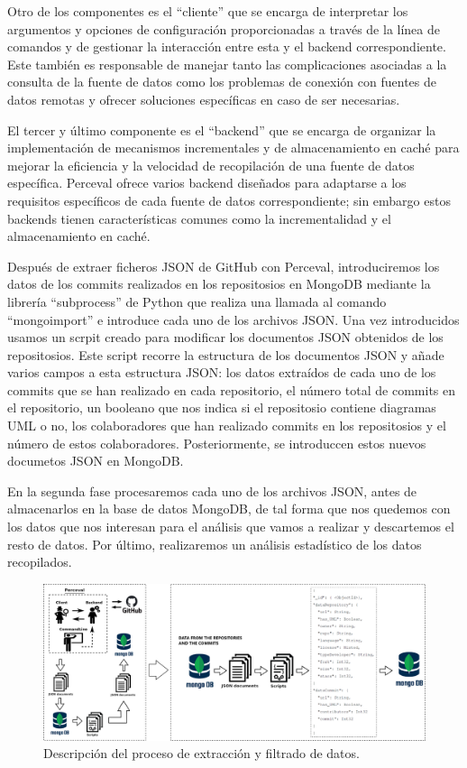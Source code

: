 \documentclass[a4paper, 12pt]{book}
\begin{document}
Otro de los componentes es el ``cliente'' que se encarga de interpretar los argumentos y opciones de configuración proporcionadas a través de la línea de comandos y de gestionar la interacción entre esta y el backend correspondiente.
Este también es responsable de manejar tanto las complicaciones asociadas a la consulta de la fuente de datos como los problemas de conexión con fuentes de datos remotas y ofrecer soluciones específicas en caso de ser necesarias.
 

El tercer y último componente es el ``backend'' que se encarga de organizar la implementación de mecanismos incrementales y de almacenamiento en caché para mejorar la eficiencia y la velocidad de recopilación de una fuente de datos específica.
Perceval ofrece varios backend diseñados para adaptarse a los requisitos específicos de cada fuente de datos correspondiente; sin embargo estos backends tienen características comunes como la incrementalidad y el almacenamiento en caché.


Después de extraer ficheros JSON de GitHub con Perceval, introduciremos los datos de los commits realizados en los repositosios en MongoDB mediante la librería ``subprocess'' de Python que realiza una llamada al comando ``mongoimport'' e introduce cada uno de los archivos JSON.
Una vez introducidos usamos un scrpit creado para modificar los documentos JSON obtenidos de los repositosios.
Este script recorre la estructura de los documentos JSON y añade varios campos a esta estructura JSON: los datos extraídos de cada uno de los commits que se han realizado en cada repositorio, el número total de commits en el repositorio, un booleano que nos indica si el repositosio contiene diagramas UML o no, los colaboradores que han realizado commits en los repositosios y el número de estos colaboradores.
Posteriormente, se introduccen estos nuevos documetos JSON en MongoDB.


En la segunda fase procesaremos cada uno de los archivos JSON, antes de almacenarlos en la base de datos MongoDB, de tal forma que nos quedemos con los datos que nos interesan para el análisis que vamos a realizar y descartemos el resto de datos.
Por último, realizaremos un análisis estadístico de los datos recopilados. 

\begin{figure}
  \centering
  \includegraphics[width=17cm, keepaspectratio]{img/Arquitectura_general.png}
  \caption{Descripción del proceso de extracción y filtrado de datos.}\label{fig:arquitectura}
\end{figure}
\end{document}
